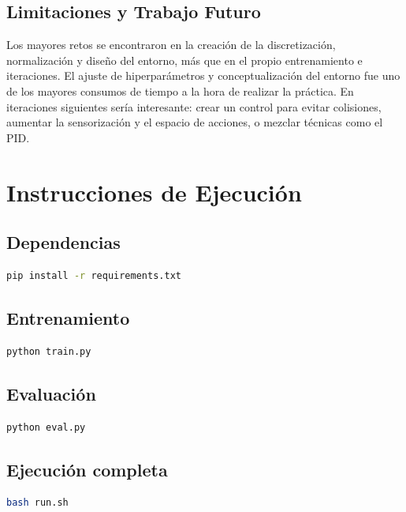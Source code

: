 \documentclass[12pt,a4paper]{article}
\begin{document}
\subsection{Limitaciones y Trabajo Futuro}

Los mayores retos se encontraron en la creación de la discretización, normalización y diseño del entorno, más que en el propio entrenamiento e iteraciones. El ajuste de hiperparámetros y conceptualización del entorno fue uno de los mayores consumos de tiempo a la hora de realizar la práctica. En iteraciones siguientes sería interesante: crear un control para evitar colisiones, aumentar la sensorización y el espacio de acciones, o mezclar técnicas como el PID.

\section{Instrucciones de Ejecución}

\subsection{Dependencias}
\begin{lstlisting}[language=bash]
pip install -r requirements.txt
\end{lstlisting}

\subsection{Entrenamiento}
\begin{lstlisting}[language=bash]
python train.py
\end{lstlisting}

\subsection{Evaluación}
\begin{lstlisting}[language=bash]
python eval.py
\end{lstlisting}

\subsection{Ejecución completa}
\begin{lstlisting}[language=bash]
bash run.sh
\end{lstlisting}
\end{document}
